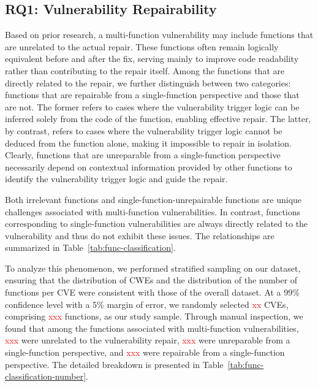 
\subsection{RQ1: Vulnerability Repairability}
Based on prior research, a multi-function vulnerability may include functions that are unrelated to the actual repair. These functions often remain logically equivalent before and after the fix, serving mainly to improve code readability rather than contributing to the repair itself. Among the functions that are directly related to the repair, we further distinguish between two categories: functions that are repairable from a single-function perspective and those that are not. The former refers to cases where the vulnerability trigger logic can be inferred solely from the code of the function, enabling effective repair. The latter, by contrast, refers to cases where the vulnerability trigger logic cannot be deduced from the function alone, making it impossible to repair in isolation. Clearly, functions that are unreparable from a single-function perspective necessarily depend on contextual information provided by other functions to identify the vulnerability trigger logic and guide the repair.

Both irrelevant functions and single-function-unrepairable functions are unique challenges associated with multi-function vulnerabilities. In contrast, functions corresponding to single-function vulnerabilities are always directly related to the vulnerability and thus do not exhibit these issues. The relationships are summarized in Table~\ref{tab:func-classification}.

To analyze this phenomenon, we performed stratified sampling on our dataset, ensuring that the distribution of CWEs and the distribution of the number of functions per CVE were consistent with those of the overall dataset. At a 99\% confidence level with a 5\% margin of error, we randomly selected \textcolor{red}{xx} CVEs, comprising \textcolor{red}{xxx} functions, as our study sample. Through manual inspection, we found that among the functions associated with multi-function vulnerabilities, \textcolor{red}{xxx} were unrelated to the vulnerability repair, \textcolor{red}{xxx} were unreparable from a single-function perspective, and \textcolor{red}{xxx} were repairable from a single-function perspective. The detailed breakdown is presented in Table~\ref{tab:func-classification-number}.


